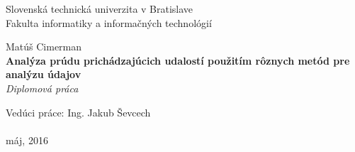 \documentclass[12pt, a4paper, titlepage, slovak]{book}
\begin{document}
\sloppy %




\frontmatter

\begin{titlepage}
\begin{center}                                                                                                                                                   
{\Large Slovenská technická univerzita v Bratislave} \\
{\Large Fakulta informatiky a informačných technológií} \\
\vspace*{1\baselineskip}
\large {}
\vfill %


{{Matúš Cimerman}} \\
\vspace*{1\baselineskip}
{\LARGE {\textbf{Analýza prúdu prichádzajúcich udalostí použitím rôznych metód pre analýzu údajov}}} %
\\
\vspace*{1\baselineskip}
\textit{Diplomová práca}\\
\vfill %
\end{center}
{Vedúci práce: Ing. Jakub Ševcech}\\
\\
{máj, 2016}
\end{titlepage}
\emptydoublepage
\end{document}
